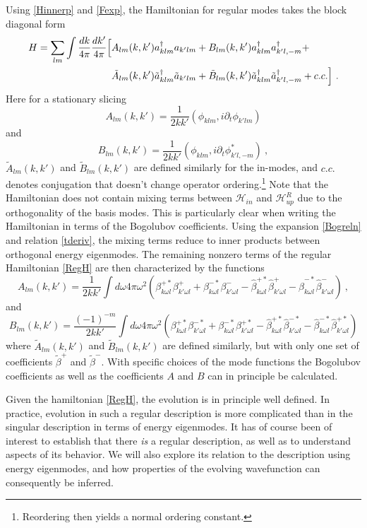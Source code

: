 \documentclass[11pt]{article}
\numberwithin{equation}{section}
\newcommand{\beq}{\begin{equation}}
\newcommand{\eeq}{\end{equation}}
\begin{document}
Using \eqref{Hinnerp} and \eqref{Fexp}, the Hamiltonian for regular modes takes the block diagonal form 
\beq\label{RegH}
\begin{split}
H= \sum_{lm} \int \frac{dk}{4 \pi }  \frac{dk'}{4 \pi }  \Bigl[&A_{lm}(k, k') a_{k lm}^{\dagger}a_{k'lm} + B_{lm}(k, k') a^{\dagger}_{k lm}a^{\dagger}_{k'l,-m} + \\ 
&\tilde{A}_{lm}(k, k')\tilde a_{k lm}^{\dagger}\tilde a_{k'lm}+\tilde{B}_{lm}(k, k')\tilde a^{\dagger}_{k lm}\tilde a^{\dagger}_{k'l,-m}  + c.c.\Bigr] \ .
\end{split}
\eeq 
Here for a stationary slicing
\beq
A_{lm}(k, k') = \frac{1}{2kk'} (\phi_{klm}, i\partial_t \phi_{k'lm})
\eeq 
and
\beq
B_{lm}(k, k') = \frac{1}{2kk'} ( \phi_{klm}, i\partial_t \phi^*_{k'l,-m})\ ,
\eeq 
 $\tilde{A}_{lm}(k, k')$ and $\tilde{B}_{lm}(k, k')$ are defined similarly for the in-modes, and $c.c.$ denotes conjugation that doesn't change operator ordering.\footnote{Reordering then yields a normal ordering constant.}
 Note that the Hamiltonian does not contain mixing terms between $\mathcal{H}_{in}$ and $\mathcal{H}^R_{up}$
due to the orthogonality of the basis modes. This is particularly clear when writing the Hamiltonian in terms of the Bogolubov coefficients. Using the expansion \eqref{Bogreln} and relation \eqref{tderiv}, the mixing terms reduce to inner products between orthogonal energy eigenmodes. The remaining nonzero terms of the regular Hamiltonian \eqref{RegH} are then characterized by the functions
\beq
A_{lm}(k, k') =\frac{1}{2kk'} \int d\omega  4\pi \omega^2 (\beta^{+*}_{k\omega l} \beta^+_{k'\omega l}+ \beta^{-*}_{k\omega l} \beta^-_{k'\omega l} - \hat \beta^{+*}_{k\omega l} \hat\beta^+_{k'\omega l}- \hat \beta^{-*}_{k\omega l} \hat \beta^-_{k'\omega l})\ ,
\eeq 
and
\beq
B_{lm}(k, k') =  \frac{(-1)^{-m}}{2kk'}\int d\omega4\pi \omega^2 (\beta^{+*}_{k\omega l} \beta^{-*}_{k'\omega l}+ \beta^{-*}_{k\omega l} \beta^{+*}_{k'\omega l} - \hat \beta^{+*}_{k\omega l} \hat\beta^{-*}_{k'\omega l}- \hat \beta^{-*}_{k\omega l} \hat \beta^{+*}_{k'\omega l})
\eeq 
where $\tilde{A}_{lm}(k, k')$ and $\tilde{B}_{lm}(k, k')$ are defined similarly, but with only one set of coefficients $\tilde\beta^+$ and $\tilde{\beta}^-$.  With specific choices of the mode functions the Bogolubov coefficients as well as the coefficients $A$ and $B$ can in principle be calculated.

Given the hamiltonian \eqref{RegH},  the evolution is in principle well defined.  In practice, evolution in such a regular description is more complicated than in the singular description in terms of energy eigenmodes.  It has of course been of interest to establish that there {\it is} a regular description, as well as to understand aspects of its behavior.  We will also explore its relation to the description using energy eigenmodes, and how properties of the evolving wavefunction can consequently be inferred.
\end{document}
